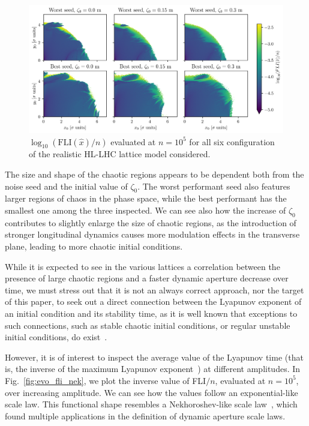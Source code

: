\begin{figure}
    \centering
    \includegraphics[width=1.0\textwidth]{6_lhc_dynamic_indicators/figs/fli_all.png}
    \caption{$\log_{10}(\mathrm{FLI}(\hat{x})/n)$ evaluated at $n=10^5$ for all six configuration of the realistic HL-LHC lattice model considered.}
    \label{fig:fli_all}
\end{figure}

The size and shape of the chaotic regions appears to be dependent both from the noise seed and the initial value of $\zeta_0$. The worst performant seed also features larger regions of chaos in the phase space, while the best performant has the smallest one among the three inspected. We can see also how the increase of $\zeta_0$ contributes to slightly enlarge the size of chaotic regions, as the introduction of stronger longitudinal dynamics causes more modulation effects in the transverse plane, leading to more chaotic initial conditions. 

While it is expected to see in the various lattices a correlation between the presence of large chaotic regions and a faster dynamic aperture decrease over time, we must stress out that it is not an always correct approach, nor the target of this paper, to seek out a direct connection between the Lyapunov exponent of an initial condition and its stability time, as it is well known that exceptions to such connections, such as stable chaotic initial conditions, or regular unstable initial conditions, do exist~\cite{}.

However, it is of interest to inspect the average value of the Lyapunov time (that is, the inverse of the maximum Lyapunov exponent~\cite{}) at different amplitudes. In Fig.~\ref{fig:evo_fli_nek}, we plot the inverse value of FLI$/n$, evaluated at $n=10^5$, over increasing amplitude. We can see how the values follow an exponential-like scale law. This functional shape resembles a Nekhoroshev-like scale law~\cite{}, which found multiple applications in the definition of dynamic aperture scale laws.

